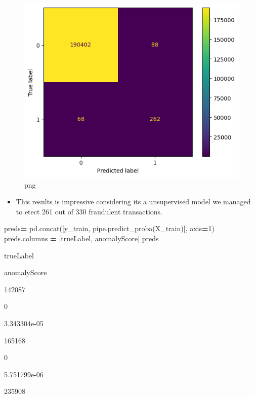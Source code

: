 \documentclass[
]{article}
\newenvironment{Shaded}{\begin{snugshade}}{\end{snugshade}}
\newcommand{\DecValTok}[1]{\textcolor[rgb]{0.00,0.00,0.81}{#1}}
\newcommand{\NormalTok}[1]{#1}
\newcommand{\OperatorTok}[1]{\textcolor[rgb]{0.81,0.36,0.00}{\textbf{#1}}}
\newcommand{\StringTok}[1]{\textcolor[rgb]{0.31,0.60,0.02}{#1}}
\providecommand{\tightlist}{%
  \setlength{\itemsep}{0pt}\setlength{\parskip}{0pt}}
\begin{document}
\begin{figure}
\centering
\includegraphics{mymarkdownfile_files/mymarkdownfile_40_0.png}
\caption{png}
\end{figure}

\begin{itemize}
\tightlist
\item
  This results is impressive considering its a unsupervised model we
  managed to etect 261 out of 330 fraudulent transactions.
\end{itemize}

\begin{Shaded}
\begin{Highlighting}[]
\NormalTok{preds}\OperatorTok{=}\NormalTok{ pd.concat([y\_train, pipe.predict\_proba(X\_train)], axis}\OperatorTok{=}\DecValTok{1}\NormalTok{)}
\NormalTok{preds.columns }\OperatorTok{=}\NormalTok{ [}\StringTok{\textquotesingle{}trueLabel\textquotesingle{}}\NormalTok{, }\StringTok{\textquotesingle{}anomalyScore\textquotesingle{}}\NormalTok{]}
\NormalTok{preds}
\end{Highlighting}
\end{Shaded}

trueLabel

anomalyScore

142087

0

3.343304e-05

165168

0

5.751799e-06

235908
\end{document}
